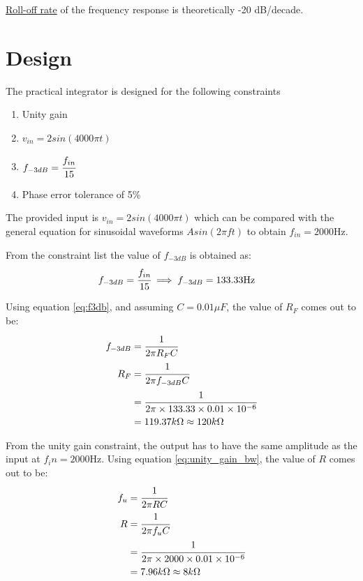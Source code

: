 \documentclass[12pt, titlepage]{article}
\theoremstyle{definition}
\begin{document}
    \underline{Roll-off rate} of the frequency response is theoretically -20 dB/decade.

  \newpage
  \section{Design}
    The practical integrator is designed for the following constraints
    \begin{enumerate}[topsep=1pt, label=(\alph*)]
      \item Unity gain
      \item $v_{in} = 2sin(4000\pi t)$
      \item $f_{-3dB} = \cfrac{f_{in}}{15}$
      \item Phase error tolerance of 5\%
    \end{enumerate}

    The provided input is $v_{in} = 2 sin(4000\pi t)$ which can be compared with the general equation for sinusoidal waveforms $A sin(2\pi ft)$ to obtain \underline{$f_{in} = 2000\text{Hz}$}.

    From the constraint list the value of \underline{$f_{-3dB}$} is obtained as:
    \begin{align*}
      f_{-3dB} &= \cfrac{f_{in}}{15}
      \implies f_{-3dB} = 133.33\text{Hz}
    \end{align*}

    Using equation \ref{eq:f3db}, and assuming \underline{$C = 0.01\mu F$}, the value of \underline{$R_F$} comes out to be:
    \begin{align*}
      f_{-3dB} &= \cfrac{1}{2\pi R_FC} \\
      R_F &= \cfrac{1}{2\pi f_{-3dB}C} \\
      &= \cfrac{1}{2\pi \times 133.33 \times 0.01 \times 10^{-6}} \\
      &= 119.37k\Omega \approx 120k\Omega
    \end{align*}

    From the unity gain constraint, the output has to have the same amplitude as the input at $f_in = 2000\text{Hz}$.
    Using equation \ref{eq:unity_gain_bw}, the value of \underline{$R$} comes out to be:
    \begin{align*}
      f_u &= \cfrac{1}{2\pi RC} \\
      R &= \cfrac{1}{2\pi f_uC}\\
      &= \cfrac{1}{2\pi \times 2000 \times 0.01 \times 10^{-6}} \\
      &= 7.96k\Omega \approx 8k\Omega
    \end{align*}
\end{document}
